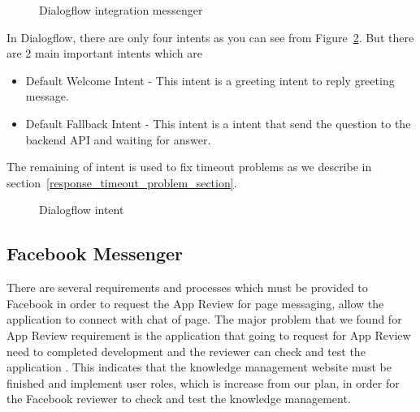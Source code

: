 \documentclass[12pt,oneside,openright,a4paper]{cpe-english-project}
\begin{document}
\begin{figure}[!h]\centering
	\caption{Dialogflow integration messenger}\label{fig:line_example}
\end{figure}
In Dialogflow, there are only four intents as you can see from Figure~\ref*{fig:Dialogflow intent}.
But there are 2 main important intents which are\begin{itemize}
	\item Default Welcome Intent - This intent is a greeting intent to reply greeting message.
	\item Default Fallback Intent - This intent is a intent that send the question to the backend API and waiting for answer.
\end{itemize}

The remaining of intent is used to fix timeout problems as we describe in section~\ref*{response_timeout_problem_section}.

\begin{figure}[!h]\centering
	\caption{Dialogflow intent}\label{fig:Dialogflow intent}
\end{figure}

\pagebreak
\subsection{Facebook Messenger}
	There are several requirements and processes which must be
	provided to Facebook in order to request the App Review for page messaging,
	allow the application to connect with chat of page.
	The major problem that we found for App Review requirement is
	the application that going to request for App Review need to completed development and 
	the reviewer can check and test the application \cite{before_you_submit}.
	This indicates that the knowledge management website must be finished and
	implement user roles, which is increase from our plan,
	in order for the Facebook reviewer to check and test the knowledge management.
\end{document}
